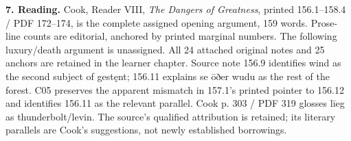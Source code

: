 \textbf{7. Reading.} Cook, Reader VIII, \emph{The Dangers of Greatness}, printed 156.1–158.4 /\allowbreak{} PDF 172–174, is the complete assigned opening argument, 159 words. Prose-line counts are editorial, anchored by printed marginal numbers. The following luxury/\allowbreak{}death argument is unassigned. All 24 attached original notes and 25 anchors are retained in the learner chapter. Source note 156.9 identifies wind as the second subject of gestęnt; 156.11 explains se ōðer wudu as the rest of the forest. C05 preserves the apparent mismatch in 157.1's printed pointer to 156.12 and identifies 156.11 as the relevant parallel. Cook p. 303 /\allowbreak{} PDF 319 glosses līeg as thunderbolt/\allowbreak{}levin. The source's qualified attribution is retained; its literary parallels are Cook's suggestions, not newly established borrowings.

\endgroup

